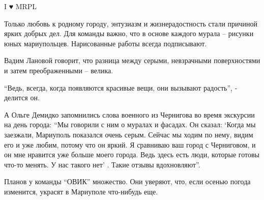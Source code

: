 I ♥ MRPL

Только любовь к родному городу, энтузиазм и жизнерадостность стали причиной
ярких добрых дел. Для команды важно, что в основе каждого мурала – рисунки юных
мариупольцев. Нарисованные работы всегда подписывают.

Вадим Лановой говорит, что разница между серыми, невзрачными поверхностями и
затем преображенными – велика.

\enquote{Ведь, всегда, когда появляются красивые вещи, они вызывают радость}, - делится
он.


А Ольге Демидко запомнились слова военного из Чернигова во время экскурсии на
день города: \enquote{Мы говорили с ним о муралах и фасадах. Он сказал:
\enquote{Когда мы заезжали, Мариуполь показался очень серым. Сейчас мы ходим по
нему, видим его и уже любим, потому что он яркий. Я сравниваю ваш город с
Черниговом, и он мне нравится уже больше моего города. Ведь здесь есть люди,
которые готовы что-то менять. У нас такого нет} . Такие отзывы вдохновляют}.

Планов у команды \enquote{ОВИК} множество. Они уверяют, что, если осенью погода
изменится, украсят в Мариуполе что-нибудь еще.
